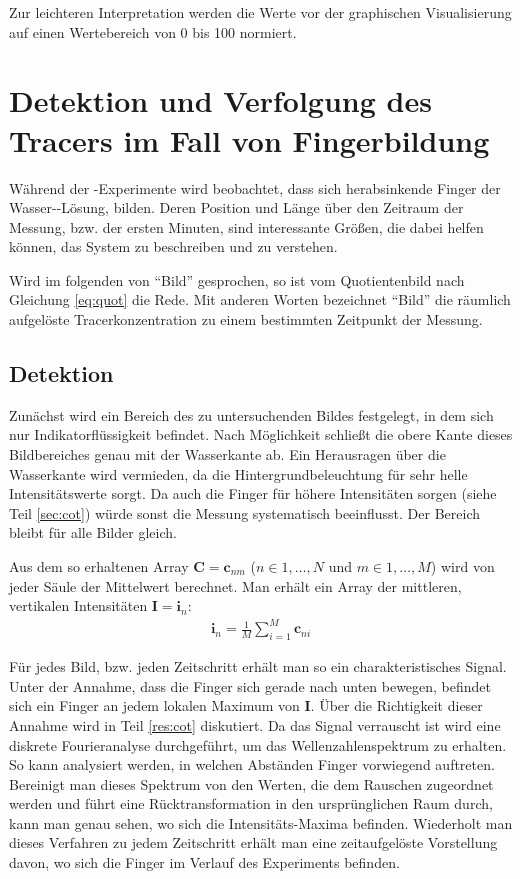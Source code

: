 Zur leichteren Interpretation werden die Werte vor der graphischen Visualisierung auf einen Wertebereich von 0 bis 100 normiert.

\section{Detektion und Verfolgung des Tracers im Fall von Fingerbildung}
\label{sec:track}
Während der \COT-Experimente wird beobachtet, dass sich herabsinkende Finger der Wasser-\COT-Lösung, bilden. Deren Position und Länge über den Zeitraum der Messung, bzw. der ersten Minuten, sind interessante Größen, die dabei helfen können, das System zu beschreiben und zu verstehen.

Wird im folgenden von ``Bild'' gesprochen, so ist vom Quotientenbild nach Gleichung \ref{eq:quot} die Rede. Mit anderen Worten bezeichnet ``Bild'' die räumlich aufgelöste Tracerkonzentration zu einem bestimmten Zeitpunkt der Messung.

\subsection{Detektion}
\label{sec:dec}
Zunächst wird ein Bereich des zu untersuchenden Bildes festgelegt, in dem sich nur Indikatorflüssigkeit befindet. Nach Möglichkeit schließt die obere Kante dieses Bildbereiches genau mit der Wasserkante ab. Ein Herausragen über die Wasserkante wird vermieden, da die Hintergrundbeleuchtung für sehr helle Intensitätswerte sorgt. Da auch die Finger für höhere Intensitäten sorgen (siehe Teil \ref{sec:cot}) würde sonst die Messung systematisch beeinflusst. Der Bereich bleibt für alle Bilder gleich.

Aus dem so erhaltenen Array $\mathbf{C} = \mathbf{c}_{nm}$ ($n \in 1,\dots,N$ und $m \in 1,\dots,M$) wird von jeder Säule der Mittelwert berechnet. Man erhält ein Array der mittleren, vertikalen Intensitäten $\mathbf{I} = \mathbf{i}_{n}$:
\begin{eqnarray}
 \mathbf{i}_{n} = \frac{1}{M} \sum_{i=1}^{M} \mathbf{c}_{ni}
\end{eqnarray}

Für jedes Bild, bzw. jeden Zeitschritt erhält man so ein charakteristisches Signal. Unter der Annahme, dass die Finger sich gerade nach unten bewegen, befindet sich ein Finger an jedem lokalen Maximum von $\mathbf{I}$. Über die Richtigkeit dieser Annahme wird in Teil \ref{res:cot} diskutiert.
Da das Signal verrauscht ist wird eine diskrete Fourieranalyse durchgeführt, um das Wellenzahlenspektrum zu erhalten. So kann analysiert werden, in welchen Abständen Finger vorwiegend auftreten. Bereinigt man dieses Spektrum von den Werten, die dem Rauschen zugeordnet werden und führt eine Rücktransformation in den ursprünglichen Raum durch, kann man genau sehen, wo sich die Intensitäts-Maxima befinden. Wiederholt man dieses Verfahren zu jedem Zeitschritt erhält man eine zeitaufgelöste Vorstellung davon, wo sich die Finger im Verlauf des Experiments befinden.

